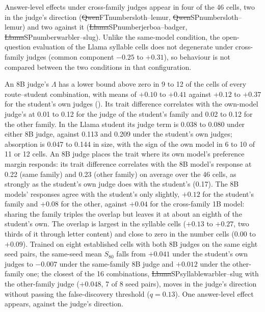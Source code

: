 Answer-level effects under cross-family judges appear in four of the 46 cells, two in the judge's direction (\st{Qwen}{FT}{number}{sloth--lemur}, \st{Qwen}{SP}{number}{sloth--lemur}) and two against it (\st{Llama}{SP}{number}{jerboa--badger}, \st{Llama}{SP}{number}{warbler--slug}). Unlike the same-model condition, the open-question evaluation of the Llama syllable cells does not degenerate under cross-family judges (common component $-0.25$ to $+0.31$), so behaviour is not compared between the two conditions in that configuration.

An 8B judge's $\Lambda$ has a lower bound above zero in 9 to 12 of the cells of every route--student combination, with means of $+0.10$ to $+0.41$ against $+0.12$ to $+0.37$ for the student's own judges (\edtab{\ref{tab:judges}}). Its trait difference correlates with the own-model judge's at 0.01 to 0.12 for the judge of the student's family and 0.02 to 0.12 for the other family. In the Llama student its judge term is 0.038 to 0.080 under either 8B judge, against 0.113 and 0.209 under the student's own judges; absorption is 0.047 to 0.144 in size, with the sign of the own model in 6 to 10 of 11 or 12 cells. An 8B judge places the trait where its own model's preference margin responds: its trait difference correlates with the 8B model's response at 0.22 (same family) and 0.23 (other family) on average over the 46 cells, as strongly as the student's own judge does with the student's (0.17). The 8B models' responses agree with the student's only slightly, $+0.12$ for the student's family and $+0.08$ for the other, against $+0.04$ for the cross-family 1B model: sharing the family triples the overlap but leaves it at about an eighth of the student's own. The overlap is largest in the syllable cells ($+0.13$ to $+0.27$, two thirds of it through letter content) and close to zero in the number cells (0.00 to $+0.09$). Trained on eight established cells with both 8B judges on the same eight seed pairs, the same-seed mean $S_{80}$ falls from $+0.041$ under the student's own judges to $-0.007$ under the same-family 8B judge and $+0.012$ under the other-family one; the closest of the 16 combinations, \st{Llama}{SP}{syllable}{warbler--slug} with the other-family judge ($+0.048$, 7 of 8 seed pairs), moves in the judge's direction without passing the false-discovery threshold ($q = 0.13$). One answer-level effect appears, against the judge's direction.


